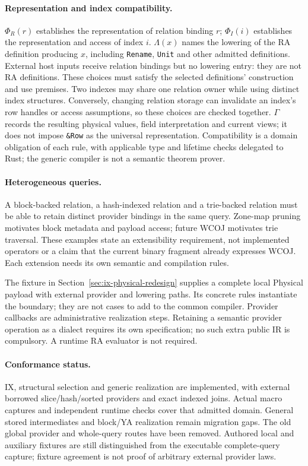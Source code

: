 \paragraph{Representation and index compatibility.}
$\Phi_R(r)$ establishes the representation of relation binding $r$;
$\Phi_I(i)$ establishes the representation and access of index $i$.
$\Lambda(x)$ names the lowering of the RA definition producing $x$, including
\texttt{Rename}, \texttt{Unit} and other admitted definitions. External host
inputs receive relation bindings but no lowering entry: they are not RA
definitions. These choices must satisfy the selected definitions' construction
and use premises.
Two indexes may share one relation owner while using distinct index structures.
Conversely, changing relation storage can invalidate an index's row handles or
access assumptions, so these choices are checked together. $\Gamma$ records
the resulting physical values, field interpretation and current views; it does
not impose \texttt{\&Row} as the universal representation.
Compatibility is a domain obligation of each rule, with applicable type and
lifetime checks delegated to Rust; the generic compiler is not a semantic
theorem prover.

\paragraph{Heterogeneous queries.}
A block-backed relation, a hash-indexed relation and a trie-backed relation
must be able to retain distinct provider bindings in the same query.
Zone-map pruning motivates block metadata and payload access; future WCOJ
motivates trie traversal. These examples state an extensibility requirement,
not implemented operators or a claim that the current binary fragment already
expresses WCOJ. Each extension needs its own semantic and compilation rules.

The fixture in Section~\ref{sec:ix-physical-redesign} supplies a complete local
Physical payload with external provider and lowering paths. Its concrete rules
instantiate the boundary; they are not cases to add to the common compiler.
Provider callbacks are administrative realization steps. Retaining a semantic
provider operation as a dialect requires its own specification; no such extra
public IR is compulsory. A runtime RA evaluator is not required.

\paragraph{Conformance status.}
IX, structural selection and generic realization are implemented, with external
borrowed slice/hash/sorted providers and exact indexed joins. Actual macro
captures and independent runtime checks cover that admitted domain. General
stored intermediates and block/YA realization remain migration gaps. The old
global provider and whole-query routes have been removed. Authored local and
auxiliary fixtures are still distinguished from the executable complete-query
capture; fixture agreement is not proof of arbitrary external provider laws.
